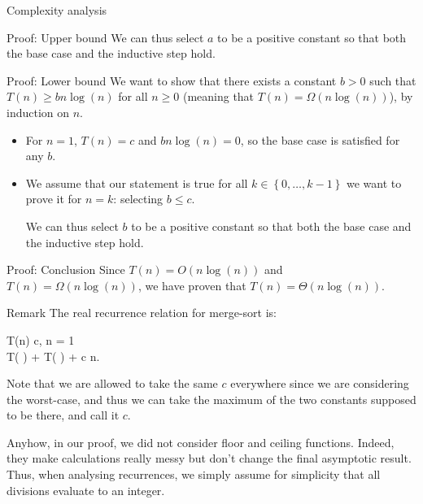\documentclass[a4paper]{article}
\begin{document}
\begin{parag}{Complexity analysis}
\begin{subparag}{Proof: Upper bound}
        We can thus select $a$ to be a positive constant so that both the base case and the inductive step hold.
        
    \end{subparag}

    \begin{subparag}{Proof: Lower bound}
        We want to show that there exists a constant $b > 0$ such that $T\left(n\right) \geq bn\log\left(n\right)$ for all $n \geq 0$ (meaning that $T\left(n\right) = \Omega\left(n \log\left(n\right)\right)$), by induction on $n$.
 
        \begin{itemize}[left=0pt]
            \item For $n = 1$, $T\left(n\right) = c$ and $b n \log\left(n\right) = 0$, so the base case is satisfied for any $b$.
            \item We assume that our statement is true for all $k \in \left\{0, \ldots, k-1\right\}$ we want to prove it for $n = k$:
            selecting $b \leq c$.

            We can thus select $b$ to be a positive constant so that both the base case and the inductive step hold.
        \end{itemize}
    \end{subparag}
    
    \begin{subparag}{Proof: Conclusion}
        Since $T\left(n\right) = O\left(n \log\left(n\right)\right)$ and $T\left(n\right) = \Omega\left(n \log\left(n\right)\right)$, we have proven that $T\left(n\right) = \Theta\left(n\log\left(n\right)\right)$.
    \end{subparag}

    \begin{subparag}{Remark}
        The real recurrence relation for merge-sort is:
        \begin{functionbypart}{T\left(n\right)}
        c, \mathspace {} n = 1 \\
        T\left(\left\lfloor {} \right\rfloor \right) + T\left(\left\lceil {} \right\rceil \right) + c \cdot n.
        \end{functionbypart}

        Note that we are allowed to take the same $c$ everywhere since we are considering the worst-case, and thus we can take the maximum of the two constants supposed to be there, and call it $c$.

        Anyhow, in our proof, we did not consider floor and ceiling functions. Indeed, they make calculations really messy but don't change the final asymptotic result. Thus, when analysing recurrences, we simply assume for simplicity that all divisions evaluate to an integer.
    \end{subparag}
    
\end{parag}
\end{document}
